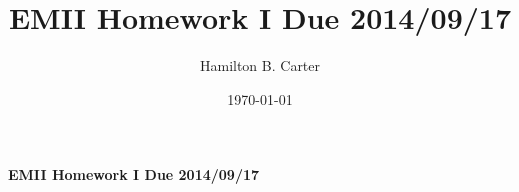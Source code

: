 \documentclass[prb,preprint]
{revtex4-1}
\begin{document}

\title{EMII Homework I Due 2014/09/17}

\author{Hamilton B. Carter}



\date{\today}









\centerline{\bf EMII Homework I Due 2014/09/17}
\bigskip
\end{document}
